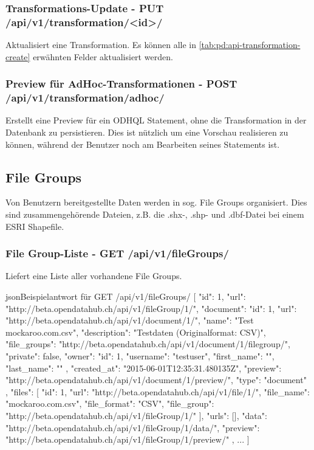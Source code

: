 \subsubsection{Transformations-Update - PUT /api/v1/transformation/<id>/}
Aktualisiert eine Transformation. Es können alle in \cref{tab:pd:api-transformation-create} erwähnten Felder aktualisiert werden.

\subsubsection{Preview für AdHoc-Transformationen - POST /api/v1/transformation/adhoc/}
Erstellt eine Preview für ein ODHQL Statement, ohne die Transformation in der Datenbank zu persistieren. Dies ist nützlich um eine Vorschau realisieren zu können, während der Benutzer noch am Bearbeiten seines Statements ist.

\subsection{File Groups}\label{sec:pd:api-filegroups}
Von Benutzern bereitgestellte Daten werden in sog. File Groups organisiert. Dies sind zusammengehörende Dateien, z.B. die .shx-, .shp- und .dbf-Datei bei einem ESRI Shapefile.

\subsubsection{File Group-Liste - GET /api/v1/fileGroups/}
Liefert eine Liste aller vorhandene File Groups.

\begin{srclst}{json}{Beispielantwort für GET /api/v1/fileGroups/}
[
    {
        "id": 1, 
        "url": "http://beta.opendatahub.ch/api/v1/fileGroup/1/", 
        "document": {
            "id": 1, 
            "url": "http://beta.opendatahub.ch/api/v1/document/1/", 
            "name": "Test mockaroo.com.csv", 
            "description": "Testdaten (Originalformat: CSV)", 
            "file_groups": "http://beta.opendatahub.ch/api/v1/document/1/filegroup/", 
            "private": false, 
            "owner": {
                "id": 1, 
                "username": "testuser", 
                "first_name": "", 
                "last_name": ""
            }, 
            "created_at": "2015-06-01T12:35:31.480135Z", 
            "preview": "http://beta.opendatahub.ch/api/v1/document/1/preview/", 
            "type": "document"
        }, 
        "files": [
            {
                "id": 1, 
                "url": "http://beta.opendatahub.ch/api/v1/file/1/", 
                "file_name": "mockaroo.com.csv", 
                "file_format": "CSV", 
                "file_group": "http://beta.opendatahub.ch/api/v1/fileGroup/1/"
            }
        ], 
        "urls": [], 
        "data": "http://beta.opendatahub.ch/api/v1/fileGroup/1/data/", 
        "preview": "http://beta.opendatahub.ch/api/v1/fileGroup/1/preview/"
    }, 
    ...
]
\end{srclst}

